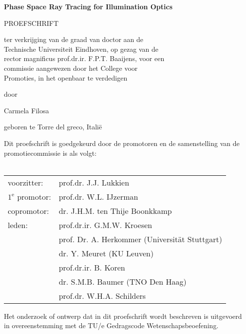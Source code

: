 \begin{center}
\begin{large}
\vspace*{3cm}
\textbf{Phase Space Ray Tracing for Illumination Optics}

\vspace*{2cm}

PROEFSCHRIFT

\vspace*{1.5cm}

ter verkrijging van de graad van doctor aan de \\ Technische Universiteit Eindhoven, op gezag van de \\ rector magnificus prof.dr.ir. F.P.T. Baaijens, voor een \\ commissie aangewezen door het College voor \\ Promoties, in het openbaar te verdedigen \\ %






\vspace*{1.5cm}

door

\vspace*{1.5cm}

Carmela Filosa

\vspace*{1.5cm}

geboren te Torre del greco, Itali\"e 

\end{large}
\end{center}

\clearpage
\thispagestyle{plain}
\begin{large}
\noindent Dit proefschrift is goedgekeurd door de promotoren en de samenstelling van de promotiecommissie is als volgt:\\
\vspace{0.4cm}\\
\begin{tabular}{ll}
voorzitter: & prof.dr. J.J. Lukkien \\
$1^{\text{e}}$ promotor: & prof.dr. W.L. IJzerman \\
copromotor: &  dr. J.H.M. ten Thije Boonkkamp \\
leden: & prof.dr.ir. G.M.W. Kroesen \\
& prof. Dr. A. Herkommer (Universität Stuttgart)\\
& dr. Y. Meuret (KU Leuven)\\
& prof.dr.ir. B. Koren\\
& dr. S.M.B. Baumer (TNO Den Haag)\\
& prof.dr. W.H.A. Schilders \\
\end{tabular}

\vspace*{10cm}
\noindent Het onderzoek of ontwerp dat in dit proefschrift  wordt beschreven is uitgevoerd in overeenstemming met de TU/e Gedragscode Wetenschapsbeoefening.
\end{large}
\clearpage

